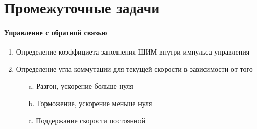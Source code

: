 \section{Промежуточные задачи}

\paragraph{Управление с обратной связью}
\begin{enumerate}
    \item Определение коэффициета заполнения ШИМ внутри импульса управления
    \item Определение угла коммутации для текущей скорости в зависимости от того
    \begin{itemize}
        \item[a. ] Разгон, ускорение больше нуля
        \item[b. ] Торможение, ускорение меньше нуля
        \item[c. ] Поддержание скорости постоянной
    \end{itemize}
\end{enumerate}

\newpage
